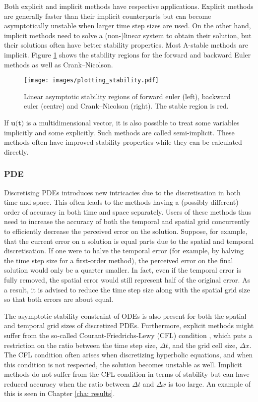 Both explicit and implicit methods have respective applications. Explicit methods are generally faster than their implicit counterparts but can become asymptotically unstable when larger time step sizes are used. On the other hand, implicit methods need to solve a (non-)linear system to obtain their solution, but their solutions often have better stability properties. Most A-stable methods are implicit. Figure \ref{fig:stability-regions} shows the stability regions for the forward and backward Euler methods as well as Crank--Nicolson. 
\begin{figure}
    \centering
    \texttt{[image: images/plotting\_stability.pdf]}
    \caption{Linear asymptotic stability regions of forward euler (left), backward euler (centre) and Crank--Nicolson (right). The stable region is red. }
    \label{fig:stability-regions}
\end{figure}
If $\textbf{u(t)}$ is a multidimensional vector, it is also possible to treat some variables implicitly and some explicitly. Such methods are called semi-implicit. These methods often have improved stability properties while they can be calculated directly. 

\subsubsection{PDE}
Discretising PDEs introduces new intricacies due to the discretisation in both time and space. This often leads to the methods having a (possibly different) order of accuracy in both time and space separately. Users of these methods thus need to increase the accuracy of both the temporal and spatial grid concurrently to efficiently decrease the perceived error on the solution. Suppose, for example, that the current error on a solution is equal parts due to the spatial and temporal discretisation. If one were to halve the temporal error (for example, by halving the time step size for a first-order method), the perceived error on the final solution would only be a quarter smaller. In fact, even if the temporal error is fully removed, the spatial error would still represent half of the original error. As a result, it is advised to reduce the time step size along with the spatial grid size so that both errors are about equal.

The asymptotic stability constraint of ODEs is also present for both the spatial and temporal grid sizes of discretized PDEs. Furthermore, explicit methods might suffer from the so-called Courant-Friedrichs-Lewy (CFL) condition \cite{courant_uber_1928}, which puts a restriction on the ratio between the time step size, $\Delta t$, and the grid cell size, $\Delta x$. The CFL condition often arises when discretizing hyperbolic equations, and when this condition is not respected, the solution becomes unstable as well. Implicit methods do not suffer from the CFL condition in terms of stability but can have reduced accuracy when the ratio between $\Delta t$ and $\Delta x$ is too large. An example of this is seen in Chapter \ref{cha: results}.  

